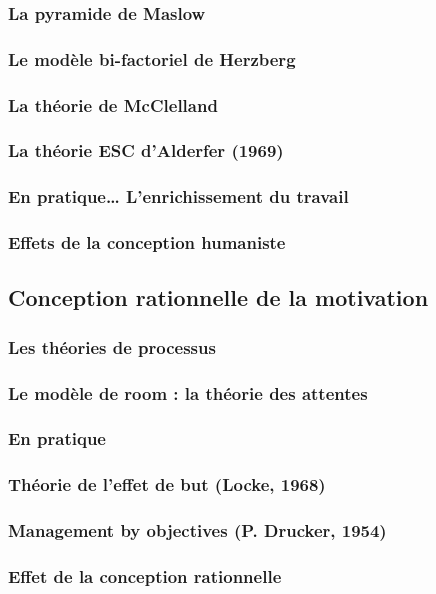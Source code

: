 \documentclass[12pt]{article}
\begin{document}
		\subsubsection{La pyramide de Maslow}
		\subsubsection{Le modèle bi-factoriel de Herzberg}
		\subsubsection{La théorie de McClelland}
		\subsubsection{La théorie ESC d’Alderfer (1969)}
		\subsubsection{En pratique… L’enrichissement du travail}
		\subsubsection{Effets de la conception humaniste}
	\subsection{Conception rationnelle de la motivation}
		\subsubsection{Les théories de processus}
		\subsubsection{Le modèle de room : la théorie des attentes}
		\subsubsection{En pratique}
		\subsubsection{Théorie de l’effet de but (Locke, 1968)}
		\subsubsection{Management by objectives (P. Drucker, 1954)}
		\subsubsection{Effet de la conception rationnelle}
\end{document}
